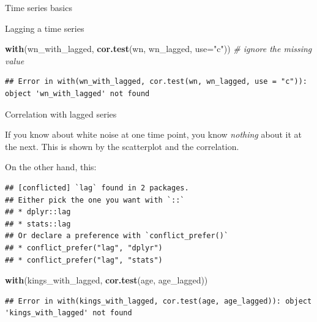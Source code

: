 \documentclass[ignorenonframetext,]{beamer}
\newenvironment{Shaded}{\begin{snugshade}}{\end{snugshade}}
\newcommand{\CommentTok}[1]{\textcolor[rgb]{0.56,0.35,0.01}{\textit{#1}}}
\newcommand{\DataTypeTok}[1]{\textcolor[rgb]{0.13,0.29,0.53}{#1}}
\newcommand{\KeywordTok}[1]{\textcolor[rgb]{0.13,0.29,0.53}{\textbf{#1}}}
\newcommand{\NormalTok}[1]{#1}
\newcommand{\OperatorTok}[1]{\textcolor[rgb]{0.81,0.36,0.00}{\textbf{#1}}}
\newcommand{\StringTok}[1]{\textcolor[rgb]{0.31,0.60,0.02}{#1}}
\begin{document}
\begin{frame}[fragile]{Time series basics}
\begin{block}{Lagging a time series}
\begin{Shaded}
\begin{Highlighting}[]
\KeywordTok{with}\NormalTok{(wn_with_lagged, }\KeywordTok{cor.test}\NormalTok{(wn, wn_lagged, }\DataTypeTok{use=}\StringTok{"c"}\NormalTok{)) }\CommentTok{# ignore the missing value}
\end{Highlighting}
\end{Shaded}

\begin{verbatim}
## Error in with(wn_with_lagged, cor.test(wn, wn_lagged, use = "c")): object 'wn_with_lagged' not found
\end{verbatim}

Correlation with lagged series

If you know about white noise at one time point, you know \emph{nothing}
about it at the next. This is shown by the scatterplot and the
correlation.

On the other hand, this:

\begin{Shaded}
\end{Shaded}

\begin{verbatim}
## [conflicted] `lag` found in 2 packages.
## Either pick the one you want with `::` 
## * dplyr::lag
## * stats::lag
## Or declare a preference with `conflict_prefer()`
## * conflict_prefer("lag", "dplyr")
## * conflict_prefer("lag", "stats")
\end{verbatim}

\begin{Shaded}
\begin{Highlighting}[]
\KeywordTok{with}\NormalTok{(kings_with_lagged, }\KeywordTok{cor.test}\NormalTok{(age, age_lagged))}
\end{Highlighting}
\end{Shaded}

\begin{verbatim}
## Error in with(kings_with_lagged, cor.test(age, age_lagged)): object 'kings_with_lagged' not found
\end{verbatim}


\end{block}
\end{frame}
\end{document}
